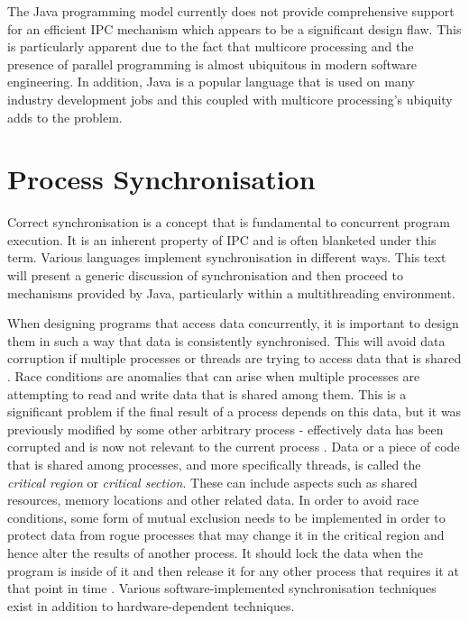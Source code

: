 \documentclass[12pt] {newrucsthesis}    %
\begin{document}
      The Java programming model currently does not provide comprehensive support for an efficient IPC mechanism which
      appears to be a significant design flaw. This is particularly apparent due to the fact that multicore processing
      and the presence of parallel programming is almost ubiquitous in modern software engineering. In addition, Java
      is a popular language that is used on many industry development jobs and this coupled with multicore processing's
      ubiquity adds to the problem.

    \section{Process Synchronisation}
      Correct synchronisation is a concept that is fundamental to concurrent program execution. It is an inherent property
      of IPC and is often blanketed under this term. Various languages implement synchronisation in different ways. This
      text will present a generic discussion of synchronisation and then proceed to mechanisms provided by Java,
      particularly within a multithreading environment.

      When designing programs that access data concurrently, it is important to design them in such a way that data is
      consistently synchronised. This will avoid data corruption if multiple processes or threads are trying to access
      data that is shared \citep{garg2005concurrent}. Race conditions are anomalies that can arise when multiple processes
      are attempting to read and write data that is shared among them. This is a significant problem if the final result
      of a process depends on this data, but it was previously modified by some other arbitrary process - effectively data
      has been corrupted and is now not relevant to the current process \citep{modernOS}. Data or a piece of code that is
      shared among processes, and more specifically threads, is called the \textit{critical region} or \textit{critical section}.
      These can include aspects such as shared resources, memory locations and other related data. In order to avoid
      race conditions, some form of mutual exclusion needs to be implemented in order to protect data from
      rogue processes that may change it in the critical region and hence alter the results of another process. It
      should lock the data when the program is inside of it and then release it for any other process that requires
      it at that point in time \citep{multithreadingwin32}. Various software-implemented synchronisation techniques
      exist in addition to hardware-dependent techniques.
\end{document}
